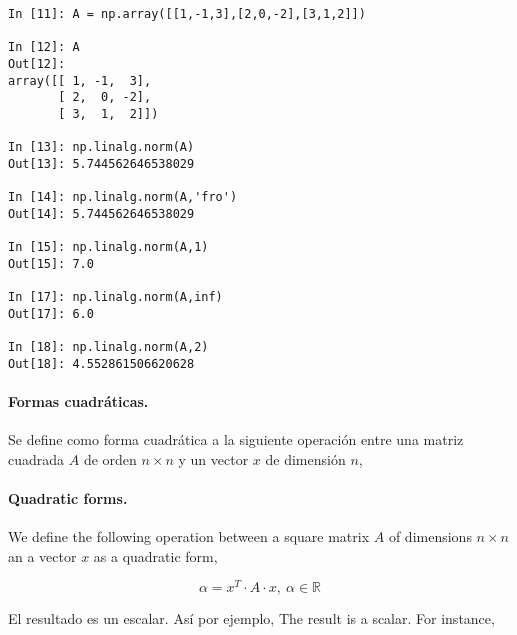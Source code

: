 \begin{center}
    \begin{minipage}{0.5\textwidth}
    \begin{verbatim}
In [11]: A = np.array([[1,-1,3],[2,0,-2],[3,1,2]])

In [12]: A
Out[12]: 
array([[ 1, -1,  3],
       [ 2,  0, -2],
       [ 3,  1,  2]])

In [13]: np.linalg.norm(A)
Out[13]: 5.744562646538029

In [14]: np.linalg.norm(A,'fro')
Out[14]: 5.744562646538029

In [15]: np.linalg.norm(A,1)
Out[15]: 7.0

In [17]: np.linalg.norm(A,inf)
Out[17]: 6.0

In [18]: np.linalg.norm(A,2)
Out[18]: 4.552861506620628
\end{verbatim}
\end{minipage}
\end{center}

\begin{paracol}{2}
\paragraph{Formas cuadráticas.} Se define como forma cuadrática a la siguiente operación entre una matriz cuadrada $A$ de orden $n \times n$ y un vector $x$ de dimensión $n$,
\switchcolumn
\paragraph{Quadratic forms.} We define the following operation between a square matrix $A$ of dimensions $n\times n$ an a vector $x$ as a quadratic form,
\end{paracol}
\begin{equation*}
\alpha=x^T\cdot A \cdot x, \ \alpha \in \mathbb{R}
\end{equation*}

\begin{paracol}{2}
El resultado es un escalar. Así por ejemplo,
\switchcolumn
The result is a scalar. For instance,
\end{paracol}


